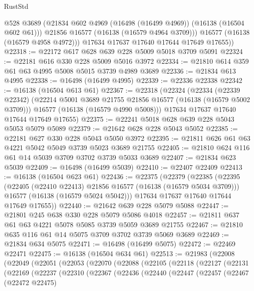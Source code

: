 \begin{lexlean}{RustStd}
\begin{coremodule}
            @528
            @3689
            (@21834 @602 @4969 (@16498 (@16499 @4969)) (@16138 (@16504 @602 @61)))
            @21856
            @16577
            (@16138 (@16579 @4964 @3709)))
          @16577
          (@16138 (@16579 @4958 @4972)))
        @17634
        @17637
        @17640
        @17644
        @17649
        @17655))
@22318 := @22172 @617 @628 @639 @228 @5009 @5018 @3709 @5091
@22324 := @22181 @616 @330 @228 @5009 @5016 @3972
@22334 := @21810 @614 @359 @61 @63 @4995 @5008 @5015 @3739 @4989 @3689
@22336 := @21834 @613 @4995
@22338 := @16498 (@16499 @4995)
@22339 := @22336 @22338
@22342 := @16138 (@16504 @613 @61)
@22367 := @22318
    (@22324
      (@22334
        (@22339 @22342)
        (@22214 @5001 @3689 @21755 @21856 @16577 (@16138 (@16579 @5002 @3709)))
        @16577
        (@16138 (@16579 @4990 @5008)))
      @17634
      @17637
      @17640
      @17644
      @17649
      @17655)
@22375 := @22241 @5018 @628 @639 @228 @5043 @5053 @5079 @5089
@22379 := @21642 @628 @228 @5043 @5052
@22385 := @22181 @627 @330 @228 @5043 @5050 @3972
@22395 := @21811 @626 @61 @63 @4221 @5042 @5049 @3739 @5023 @3689 @21755
@22405 := @21810 @624 @116 @61 @14 @5039 @3709 @3702 @3739 @5033 @3689
@22407 := @21834 @623 @5039
@22409 := @16498 (@16499 @5039)
@22410 := @22407 @22409
@22413 := @16138 (@16504 @623 @61)
@22436 := @22375
    (@22379
      (@22385
        (@22395
          (@22405 (@22410 @22413) @21856 @16577 (@16138 (@16579 @5034 @3709)))
          @16577
          (@16138 (@16579 @5024 @5042)))
        @17634
        @17637
        @17640
        @17644
        @17649
        @17655))
@22440 := @21642 @639 @228 @5079 @5088
@22447 := @21801 @245 @638 @330 @228 @5079 @5086 @4018
@22457 := @21811 @637 @61 @63 @4221 @5078 @5085 @3739 @5059 @3689 @21755
@22467 := @21810 @635 @116 @61 @14 @5075 @3709 @3702 @3739 @5069 @3689
@22469 := @21834 @634 @5075
@22471 := @16498 (@16499 @5075)
@22472 := @22469 @22471
@22475 := @16138 (@16504 @634 @61)
@22513 := @21983
    (@22008
      (@22049
        (@22051
          (@22053
            (@22070
              (@22088
                (@22105
                  (@22118
                    (@22127
                      (@22131
                        (@22169
                          (@22237
                            (@22310
                              (@22367
                                (@22436
                                  (@22440
                                    (@22447
                                      (@22457
                                        (@22467
                                          (@22472 @22475)

\end{coremodule}
\end{lexlean}
